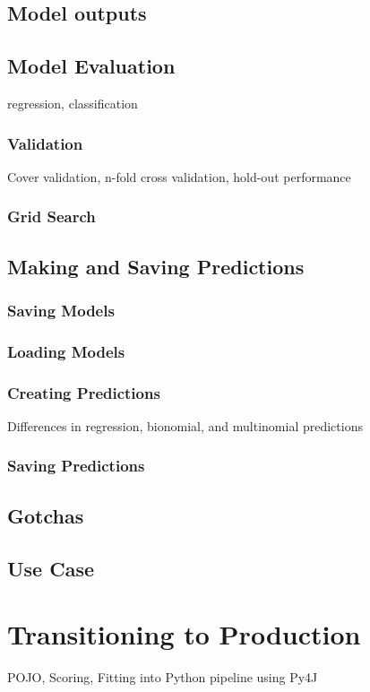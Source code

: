 \subsection{Model outputs}
\subsection{Model Evaluation}
regression, classification
\subsubsection{Validation}
Cover validation, n-fold cross validation, hold-out performance
\subsubsection{Grid Search}

\subsection{Making and Saving Predictions}
\subsubsection{Saving Models}
\subsubsection{Loading Models}
\subsubsection{Creating Predictions}
Differences in regression, bionomial, and multinomial predictions
\subsubsection{Saving Predictions}

\subsection{Gotchas}

\subsection{Use Case}

\section{Transitioning to Production}
POJO, Scoring, Fitting into Python pipeline using Py4J

